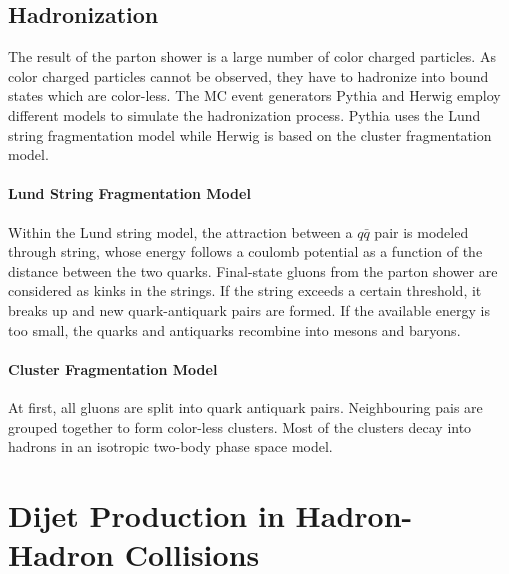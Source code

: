 \subsection{Hadronization}

The result of the parton shower is a large number of color charged particles. As
color charged particles cannot be observed, they have to hadronize into bound
states which are color-less. The MC event generators Pythia and Herwig employ
different models to simulate the hadronization process. Pythia uses the Lund
string fragmentation model while Herwig is based on the cluster fragmentation
model.

\paragraph{Lund String Fragmentation Model}

Within the Lund string model, the attraction between a $q\bar q$ pair is
modeled through string, whose energy follows a coulomb potential as a function
of the distance between the two quarks. Final-state gluons from the parton
shower are considered as kinks in the strings. If the string exceeds a certain
threshold, it breaks up and new quark-antiquark pairs are formed. If the
available energy is too small, the quarks and antiquarks recombine into mesons
and baryons.

\paragraph{Cluster Fragmentation Model}

At first, all gluons are split into quark antiquark pairs. Neighbouring pais are
grouped together to form color-less clusters. Most of the clusters decay into
hadrons in an isotropic two-body phase space model.

\section{Dijet Production in Hadron-Hadron Collisions}

